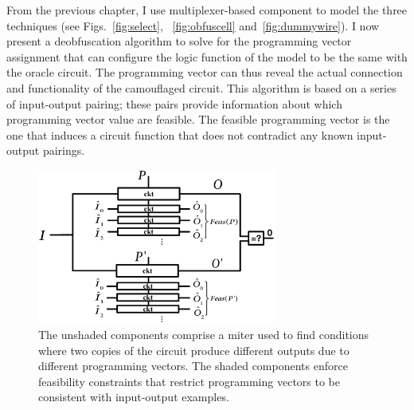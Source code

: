 \documentclass[thesis]{umassthesis}  %
\begin{document}
From the previous chapter, I use multiplexer-based component to model the three techniques (see Figs.~\ref{fig:select}, ~\ref{fig:obfuscell} and~\ref{fig:dummywire}). I now present a deobfuscation algorithm to solve for the programming vector assignment that can configure the logic function of the model to be the same with the oracle circuit.  The programming vector can thus reveal the actual connection and functionality of the camouflaged circuit. This algorithm is based on a series of input-output pairing; these pairs provide information about which programming vector value are feasible. The feasible programming vector is the one that induces a circuit function that does not contradict any known input-output pairings.


  \begin{figure}[!htb]
  \centering
    \includegraphics[width=0.7\textwidth]{./figures/miter} 
    \caption{The unshaded components comprise a miter used to find conditions where two copies of the circuit produce different outputs due to different programming vectors. The shaded components enforce feasibility constraints that restrict programming vectors to be consistent with input-output examples.}
    \label{fig:miter}
  \end{figure}
\end{document}
